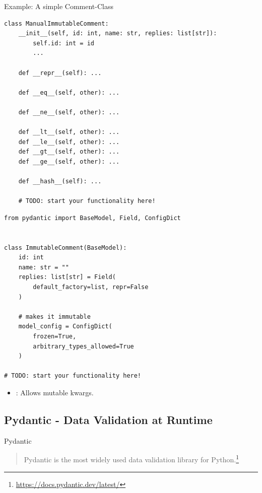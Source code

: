 \documentclass[12pt, aspectratio=169, usepdftitle=false]{beamer}
\newcommand{\pp}[1]{\lpl{#1}}
\newcommand{\furl}[1]{\footnote{\url{#1}}}
\begin{document}
\begin{frame}[fragile]{Example: A simple Comment-Class}

\pause

\begin{minipage}{0.45\textwidth}
\begin{lstlisting}[language=pytiny]
class ManualImmutableComment:
    __init__(self, id: int, name: str, replies: list[str]):
        self.id: int = id
        ...

    def __repr__(self): ...

    def __eq__(self, other): ...
    
    def __ne__(self, other): ...

    def __lt__(self, other): ...
    def __le__(self, other): ...
    def __gt__(self, other): ...
    def __ge__(self, other): ...
    
    def __hash__(self): ...
    
    # TODO: start your functionality here!
	\end{lstlisting}
\end{minipage}
\hfill
\pause
\begin{minipage}{0.45\textwidth}
	\begin{lstlisting}[language=pytiny]
from pydantic import BaseModel, Field, ConfigDict


class ImmutableComment(BaseModel):
    id: int
    name: str = ""
    replies: list[str] = Field( 
        default_factory=list, repr=False
    )

    # makes it immutable
    model_config = ConfigDict(
        frozen=True,
        arbitrary_types_allowed=True
    )

# TODO: start your functionality here!

	\end{lstlisting}
\pause
	\begin{itemize}
		\item \pp{Field}: Allows mutable kwargs.
	\end{itemize}
\end{minipage}
	
\end{frame}


\subsection{Pydantic - Data Validation at Runtime}

\begin{frame}{Pydantic}
	\begin{quotation}
		Pydantic is the most widely used data validation library for Python.\furl{https://docs.pydantic.dev/latest/}
	\end{quotation}
\end{frame}
\end{document}
